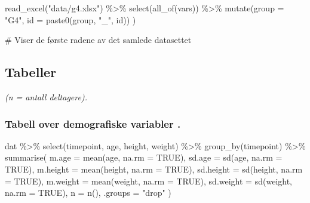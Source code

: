 \documentclass[
  letterpaper,
  DIV=11,
  numbers=noendperiod]{scrreprt}
\newenvironment{Shaded}{\begin{snugshade}}{\end{snugshade}}
\newcommand{\AttributeTok}[1]{\textcolor[rgb]{0.40,0.45,0.13}{#1}}
\newcommand{\CommentTok}[1]{\textcolor[rgb]{0.37,0.37,0.37}{#1}}
\newcommand{\ConstantTok}[1]{\textcolor[rgb]{0.56,0.35,0.01}{#1}}
\newcommand{\FunctionTok}[1]{\textcolor[rgb]{0.28,0.35,0.67}{#1}}
\newcommand{\NormalTok}[1]{\textcolor[rgb]{0.00,0.23,0.31}{#1}}
\newcommand{\SpecialCharTok}[1]{\textcolor[rgb]{0.37,0.37,0.37}{#1}}
\newcommand{\StringTok}[1]{\textcolor[rgb]{0.13,0.47,0.30}{#1}}
\begin{document}
\begin{Shaded}
\begin{Highlighting}[]
\FunctionTok{read\_excel}\NormalTok{(}\StringTok{"data/g4.xlsx"}\NormalTok{) }\SpecialCharTok{\%\textgreater{}\%}
   \FunctionTok{select}\NormalTok{(}\FunctionTok{all\_of}\NormalTok{(vars)) }\SpecialCharTok{\%\textgreater{}\%}
  \FunctionTok{mutate}\NormalTok{(}\AttributeTok{group =} \StringTok{"G4"}\NormalTok{, }
         \AttributeTok{id =} \FunctionTok{paste0}\NormalTok{(group, }\StringTok{"\_"}\NormalTok{, id)) )}


\CommentTok{\# Viser de første radene av det samlede datasettet}
\end{Highlighting}
\end{Shaded}

\subsection{Tabeller}\label{tabeller}

\emph{(n = antall deltagere).}

\subsubsection{Tabell over demografiske variabler
.}\label{tabell-over-demografiske-variabler-.}

\begin{Shaded}
\begin{Highlighting}[]
\NormalTok{dat }\SpecialCharTok{\%\textgreater{}\%}
  \FunctionTok{select}\NormalTok{(timepoint, age, height, weight) }\SpecialCharTok{\%\textgreater{}\%}
  \FunctionTok{group\_by}\NormalTok{(timepoint) }\SpecialCharTok{\%\textgreater{}\%}
  \FunctionTok{summarise}\NormalTok{(}
    \AttributeTok{m.age =} \FunctionTok{mean}\NormalTok{(age, }\AttributeTok{na.rm =} \ConstantTok{TRUE}\NormalTok{),}
    \AttributeTok{sd.age =} \FunctionTok{sd}\NormalTok{(age, }\AttributeTok{na.rm =} \ConstantTok{TRUE}\NormalTok{),}
    \AttributeTok{m.height =} \FunctionTok{mean}\NormalTok{(height, }\AttributeTok{na.rm =} \ConstantTok{TRUE}\NormalTok{),}
    \AttributeTok{sd.height =} \FunctionTok{sd}\NormalTok{(height, }\AttributeTok{na.rm =} \ConstantTok{TRUE}\NormalTok{),}
    \AttributeTok{m.weight =} \FunctionTok{mean}\NormalTok{(weight, }\AttributeTok{na.rm =} \ConstantTok{TRUE}\NormalTok{),}
    \AttributeTok{sd.weight =} \FunctionTok{sd}\NormalTok{(weight, }\AttributeTok{na.rm =} \ConstantTok{TRUE}\NormalTok{),}
    \AttributeTok{n =} \FunctionTok{n}\NormalTok{(),}
    \AttributeTok{.groups =} \StringTok{"drop"}
\NormalTok{  )}
\end{Highlighting}
\end{Shaded}
\end{document}
